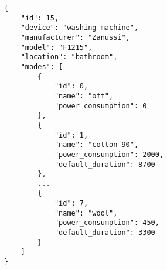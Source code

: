 \begin{lstlisting}[language=numbered,caption={[JSON file describing the washing machine]JSON file describing the washing machine.},label=code:appliance_washing_machine,float,floatplacement=H]
{
	"id": 15,
	"device": "washing machine",
	"manufacturer": "Zanussi",
	"model": "F1215",
	"location": "bathroom",
	"modes": [
		{
			"id": 0,
			"name": "off",
			"power_consumption": 0
		},
		{
			"id": 1,
			"name": "cotton 90",
			"power_consumption": 2000,
			"default_duration": 8700
		},
		...	
		{
			"id": 7,
			"name": "wool",
			"power_consumption": 450,
			"default_duration": 3300
		}
	]
}
\end{lstlisting}